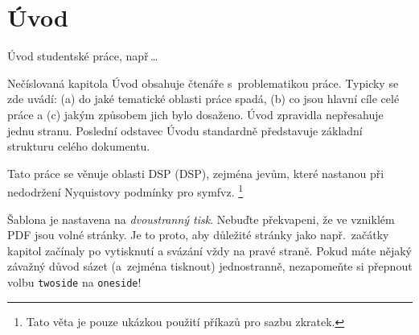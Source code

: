 \chapter*{Úvod}
{}


Úvod studentské práce, např\,\dots

Nečíslovaná kapitola Úvod obsahuje  čtenáře s~problematikou práce.
Typicky se zde uvádí:
(a) do jaké tematické oblasti práce spadá, (b) co jsou hlavní cíle celé práce a (c) jakým způsobem jich bylo dosaženo.
Úvod zpravidla nepřesahuje jednu stranu.
Poslední odstavec Úvodu standardně představuje základní strukturu celého dokumentu.

Tato práce se věnuje oblasti \acs{DSP} (\acl{DSP}), zejména jevům, které nastanou při nedodržení Nyquistovy podmínky pro \ac{symfvz}.%
\footnote{Tato věta je pouze ukázkou použití příkazů pro sazbu zkratek.}

Šablona je nastavena na \emph{dvoustranný tisk}.
Nebuďte překvapeni, že ve vzniklém PDF jsou volné stránky.
Je to proto, aby důležité stránky jako např.\ začátky kapitol začínaly po vytisknutí a svázání vždy na pravé straně.
%
Pokud máte nějaký závažný důvod sázet (a~zejména tisknout) jednostranně, nezapomeňte si přepnout volbu \texttt{twoside} na \texttt{oneside}!